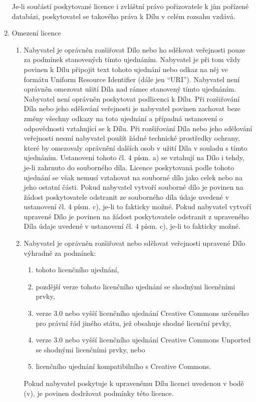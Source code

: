 \begin{enumerate}
Je-li součástí poskytované licence i zvláštní právo pořizovatele k jím pořízené databázi, poskytovatel se takového práva k Dílu v celém rozsahu vzdává.

  \item Omezení licence
    \begin{enumerate}
      \item Nabyvatel je oprávněn rozšiřovat Dílo nebo ho sdělovat veřejnosti pouze za podmínek stanovených tímto ujednáním. Nabyvatel je při tom vždy povinen k Dílu připojit text tohoto ujednání nebo odkaz na něj ve formátu Uniform Resource Identifier (dále jen ``URI''). Nabyvatel není oprávněn omezovat užití Díla nad rámec stanovený tímto ujednáním. Nabyvatel není oprávněn poskytovat podlicenci k Dílu. Při rozšiřování Díla nebo jeho sdělování veřejnosti je nabyvatel povinen zachovat beze změny všechny odkazy na toto ujednání a případná ustanovení o odpovědnosti vztahující se k Dílu. Při rozšiřování Díla nebo jeho sdělování veřejnosti nesmí nabyvatel použít žádné technické prostředky ochrany, které by omezovaly oprávnění dalších osob v užití Díla v souladu s tímto ujednáním. Ustanovení tohoto čl. 4 písm. a) se vztahují na Dílo i tehdy, je-li zahrnuto do souborného díla. Licence poskytovaná podle tohoto ujednání se však nemusí vztahovat na souborné dílo jako celek nebo na jeho ostatní části. Pokud nabyvatel vytvoří souborné dílo je povinen na žádost poskytovatele odstranit ze souborného díla údaje uvedené v ustanovení čl. 4 písm. c), je-li to fakticky možné. Pokud nabyvatel vytvoří upravené Dílo je povinen na žádost poskytovatele odstranit z upraveného Díla údaje uvedené v ustanovení čl. 4 písm. c), je-li to fakticky možné.
      \item Nabyvatel je oprávněn rozšiřovat nebo sdělovat veřejnosti upravené Dílo výhradně za podmínek:
        \begin{enumerate}
          \item tohoto licenčního ujednání,
          \item pozdější verze tohoto licenčního ujednání se shodnými licenčními prvky,
          \item verze 3.0 nebo vyšší licenčního ujednání Creative Commons určeného pro právní řád jiného státu, jež obsahuje shodné licenční prvky,
          \item verze 3.0 nebo vyšší licenčního ujednání Creative Commons Unported se shodnými licenčními prvky, nebo
          \item licenčního ujednání kompatibilního s Creative Commons.
        \end{enumerate}
Pokud nabyvatel poskytuje k upravenému Dílu licenci uvedenou v bodě (v), je povinen dodržovat podmínky této licence.


\end{enumerate}
\end{enumerate}
